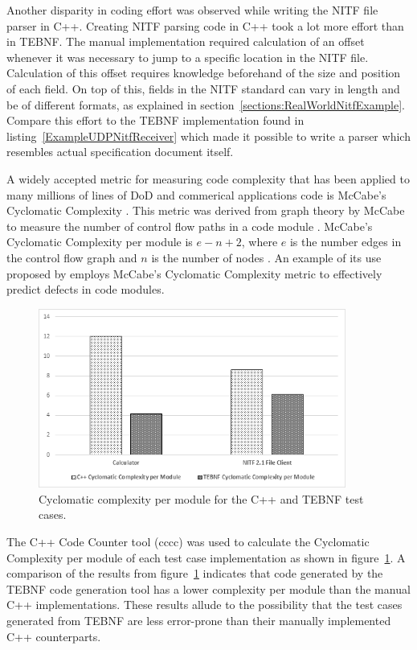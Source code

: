 \indent
Another disparity in coding effort was observed while writing the NITF file parser in C++.  Creating NITF parsing code in C++ took a lot more effort than in TEBNF.  The manual implementation required calculation of an offset whenever it was necessary to jump to a specific location in the NITF file.  Calculation of this offset requires knowledge beforehand of the size and position of each field.  On top of this, fields in the NITF standard can vary in length and be of different formats, as explained in section~\ref{sections:RealWorldNitfExample}.  Compare this effort to the TEBNF implementation found in listing~\ref{ExampleUDPNitfReceiver} which made it possible to write a parser which resembles actual specification document itself.

\indent
A widely accepted metric for measuring code complexity that has been applied to many millions of lines of  DoD and commerical applications code is McCabe's Cyclomatic Complexity \cite{cardoso_01}.  This metric was derived from graph theory by McCabe to measure the number of control flow paths in a code module \cite{cardoso_01}.  McCabe's Cyclomatic Complexity per module is $ e - n + 2 $, where $e$ is the number edges in the control flow graph and $n$ is the number of nodes \cite{cardoso_01}.  An example of its use proposed by \cite{zhang_01} employs McCabe's Cyclomatic Complexity metric to effectively predict defects in code modules.

\begin{figure}[ht!]
\centering
\includegraphics[width=0.9\textwidth]{figures/CyclomaticComplexityPerModule.png}
\caption{Cyclomatic complexity per module for the C++ and TEBNF test cases.}
\label{fig:CyclomaticComplexityPerModule}
\end{figure}

\indent
The C++ Code Counter tool (cccc) \cite{cccc_01} was used to calculate the Cyclomatic Complexity per module of each test case implementation as shown in figure~\ref{fig:CyclomaticComplexityPerModule}.  A comparison of the results from figure~\ref{fig:CyclomaticComplexityPerModule} indicates that code generated by the TEBNF code generation tool has a lower complexity per module than the manual C++ implementations.  These results allude to the possibility that the test cases generated from TEBNF are less error-prone than their manually implemented C++ counterparts.


